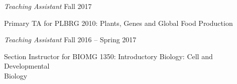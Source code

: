 \documentclass[10pt]{article}
\begin{document}
\textit{Teaching Assistant}%
    \hfill Fall 2017\\
    \vspace{-1\baselineskip}
    \begin{innerlist}
        \item Primary TA for PLBRG 2010: Plants, Genes and Global Food Production
    \end{innerlist}

\textit{Teaching Assistant}%
    \hfill Fall 2016 -- Spring 2017\\
    \vspace{-1\baselineskip}
    \begin{innerlist}
        \item Section Instructor for BIOMG 1350: Introductory Biology: Cell and Developmental\\ Biology
    \end{innerlist}
\end{document}
